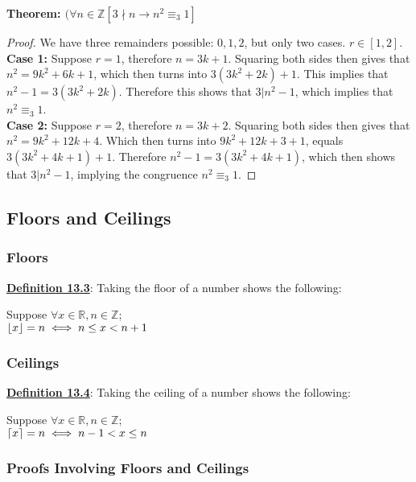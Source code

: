 \begin{example}
    \textbf{Theorem: $(\forall n \in \mathbb{Z} [3 \nmid n \rightarrow n^2 \equiv_3 1]$}
\end{example}

\begin{proof}
    We have three remainders possible: $0, 1, 2$, but only two cases. $r \in [1,2]$.\\
    \textbf{Case 1:} Suppose $r=1$, therefore $n=3k+1$. Squaring both sides then gives that $n^2=9k^2+6k+1$, which then turns into $3(3k^2+2k)+1$. This implies that $n^2-1=3(3k^2+2k)$. Therefore this shows that $3|n^2-1$, which implies that $n^2 \equiv_3 1$.\\
    \textbf{Case 2:} Suppose $r=2$, therefore $n=3k+2$. Squaring both sides then gives that $n^2=9k^2+12k+4$. Which then turns into $9k^2+12k+3+1$, equals $3(3k^2+4k+1)+1$. Therefore $n^2-1=3(3k^2+4k+1)$, which then shows that $3|n^2-1$, implying the congruence $n^2 \equiv_3 1$.
\end{proof}

\subsection{Floors and Ceilings}
\subsubsection{Floors}
\textbf{\underline{Definition 13.3}}: Taking the floor of a number shows the following:

\begin{center}
    Suppose $\forall x \in \mathbb{R}, n \in \mathbb{Z}$;\\
    $\left\lfloor x \right\rfloor = n \iff n \leq x < n+1$
\end{center}

\subsubsection{Ceilings}
\textbf{\underline{Definition 13.4}}: Taking the ceiling of a number shows the following:

\begin{center}
    Suppose $\forall x \in \mathbb{R}, n \in \mathbb{Z}$;\\
    $\left\lceil x \right\rceil = n \iff n - 1 < x \leq n$
\end{center}

\subsubsection{Proofs Involving Floors and Ceilings}

